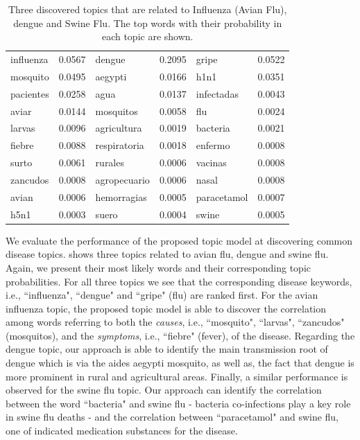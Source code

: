 \documentclass[twoside,leqno,twocolumn]{article}
\begin{document}
\begin{table}[t]
\scriptsize
\begin{center}
\captionsetup{font=scriptsize}
\caption{Three discovered topics that are related to Influenza (Avian Flu), dengue and Swine Flu. The top words with their probability in each topic are shown.}
\begin{tabular}{|lr|lr|lr|}
\hline
influenza & 0.0567 & dengue & 0.2095 & gripe & 0.0522 \\
mosquito & 0.0495 & aegypti & 0.0166 & h1n1 & 0.0351 \\
pacientes & 0.0258 & agua & 0.0137  & infectadas &0.0043 \\
aviar & 0.0144 & mosquitos & 0.0058  & flu & 0.0024\\
larvas & 0.0096 & agricultura & 0.0019 & bacteria & 0.0021 \\
fiebre & 0.0088 & respiratoria & 0.0018 & enfermo & 0.0008 \\
surto & 0.0061 & rurales & 0.0006 & vacinas & 0.0008 \\
zancudos & 0.0008 & agropecuario	 & 0.0006 & nasal & 0.0008 \\
avian & 0.0006 & hemorragias & 0.0005 & paracetamol & 0.0007 \\
h5n1 & 0.0003 & suero & 0.0004 & swine & 0.0005 \\
\hline
\end{tabular}\label{tab:common_topics}
\end{center}
\end{table}

We evaluate the performance of the proposed topic model at discovering common disease topics.  shows three topics related to avian flu, dengue and swine flu. Again, we present their most likely words and their corresponding topic probabilities. For all three topics we see that the corresponding disease keywords, i.e., ``influenza",  ``dengue" and ``gripe" (flu) are ranked first. For the avian influenza topic, the proposed topic model is able to discover the correlation among words referring to both the {\em causes}, i.e., ``mosquito", ``larvas", ``zancudos" (mosquitos), and the {\em symptoms}, i.e., ``fiebre" (fever), of the disease. Regarding the dengue topic, our approach is able to identify the main transmission root of dengue which is via the aides aegypti mosquito, as well as, the fact that dengue is more prominent in rural and agricultural areas. Finally, a similar performance is observed for the swine flu topic. Our approach can identify the correlation between the word ``bacteria" and swine flu - bacteria co-infections play a key role in swine flu deaths - and the correlation between ``paracetamol" and swine flu, one of indicated medication substances for the disease.
\end{document}
